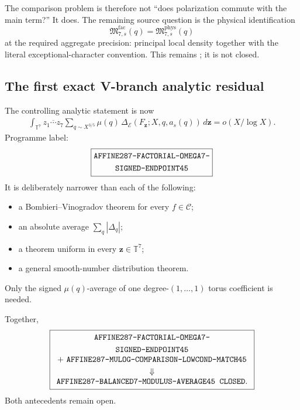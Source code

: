 \documentclass[11pt]{article}
\theoremstyle{definition}
\newcommand{\1}{\mathbf 1}
\begin{document}
{{{The comparison problem is therefore not ``does polarization commute with the main term?''
It does.  The remaining source question is the physical identification
\[
\boxed{\mathfrak M^{\mathrm{fac}}_{7,s}(q)
=\mathfrak M^{\mathrm{phys}}_{7,s}(q)}
\]
at the required aggregate precision: principal local density together with the literal
exceptional-character convention.  This remains
; it is not closed.

\subsection{The first exact V-branch analytic residual}\label{sec:factorial-endpoint}

The controlling analytic statement is now
\[
\boxed{
\begin{aligned}
\int_{\mathbb T^7}\overline{z_1\cdots z_7}
\sum_{q\sim X^{3/5}}\mu(q)\,
\Delta_{\mathcal E}
\left(F_{\mathbf z};X,q,a_s(q)\right)\,d\mathbf z
=o(X/\log X).
\end{aligned}}
\]
Programme label:
\[
\boxed{\begin{gathered}\text{\ttfamily AFFINE287-FACTORIAL-OMEGA7-}\\\text{\ttfamily SIGNED-ENDPOINT45}\end{gathered}}
\]
It is deliberately narrower than each of the following:
\begin{itemize}[leftmargin=1.6em]
\item a Bombieri--Vinogradov theorem for every $f\in\mathcal C$;
\item an absolute average $\sum_q|\Delta_q|$;
\item a theorem uniform in every $\mathbf z\in\mathbb T^7$;
\item a general smooth-number distribution theorem.
\end{itemize}
Only the signed $\mu(q)$-average of one degree-$(1,\ldots,1)$ torus coefficient is needed.

Together,
\[
\boxed{
\begin{array}{c}
\begin{gathered}\text{\ttfamily AFFINE287-FACTORIAL-OMEGA7-}\\\text{\ttfamily SIGNED-ENDPOINT45}\end{gathered}\\
+\ \texttt{AFFINE287-MULOG-COMPARISON-LOWCOND-MATCH45}\\[1mm]
\Downarrow\\
\texttt{AFFINE287-BALANCED7-MODULUS-AVERAGE45\ CLOSED}.
\end{array}}
\]
Both antecedents remain open.

}}}
\end{document}
